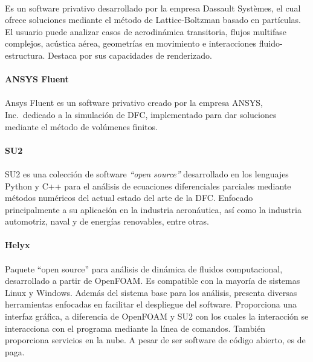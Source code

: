 \documentclass[letterpaper, openright, 12pt]{book}
\begin{document}
    \paragraph*{}
    Es un software privativo desarrollado por la empresa Dassault Systèmes, el
    cual ofrece soluciones mediante el método de Lattice-Boltzman basado en
    partículas. El usuario puede analizar casos de aerodinámica transitoria,
    flujos multifase complejos, acústica aérea, geometrías en movimiento e
    interacciones fluido-estructura. Destaca por sus capacidades de
    renderizado.\cite{xflow}

    \paragraph*{ANSYS Fluent}
    \paragraph*{}
    Ansys Fluent es un software privativo creado por la empresa ANSYS, Inc.\
    dedicado a la simulación de DFC, implementado para dar soluciones mediante
    el método de volúmenes finitos.

    \paragraph*{SU2}
    \paragraph*{}
    SU2 es una colección de software \textit{``open source''} desarrollado en
    los lenguajes Python y C++ para el análisis de ecuaciones diferenciales
    parciales mediante métodos numéricos del actual estado del arte de la
    DFC\@. Enfocado principalmente a su aplicación en la industria aeronáutica,
    así como la industria automotriz, naval y de energías renovables, entre
    otras.\cite{SU2}

    \paragraph*{Helyx}
    \paragraph*{}
    Paquete ``open source'' para análisis de dinámica de fluidos
    computacional, desarrollado a partir de OpenFOAM\@. Es compatible con la
    mayoría de sistemas Linux y Windows. Además del sistema base para los
    análisis, presenta diversas herramientas enfocadas en facilitar el
    despliegue del software. Proporciona una interfaz gráfica, a diferencia de
    OpenFOAM y SU2 con los cuales la interacción se interacciona con el
    programa mediante la línea de comandos. También proporciona servicios en la
    nube. A pesar de ser software de código abierto, es de paga.\cite{helyx}
\end{document}
